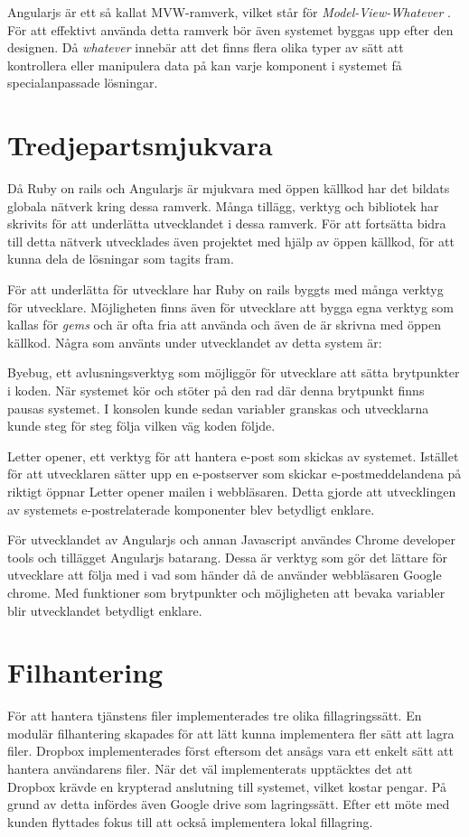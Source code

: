 Angularjs är ett så kallat MVW-ramverk, vilket står för \textit{Model-View-Whatever} \cite{angularjs}. För att effektivt använda detta ramverk bör även systemet byggas upp efter den designen. Då \textit{whatever} innebär att det finns flera olika typer av sätt att kontrollera eller manipulera data på kan varje komponent i systemet få specialanpassade lösningar.

\section{Tredjepartsmjukvara}
Då Ruby on rails och Angularjs är mjukvara med öppen källkod har det bildats globala nätverk kring dessa ramverk. Många tillägg, verktyg och bibliotek har skrivits för att underlätta utvecklandet i dessa ramverk. För att fortsätta bidra till detta nätverk utvecklades även projektet med hjälp av öppen källkod, för att kunna dela de lösningar som tagits fram.

För att underlätta för utvecklare har Ruby on rails byggts med många verktyg för utvecklare. Möjligheten finns även för utvecklare att bygga egna verktyg som kallas för \textit{gems} och är ofta fria att använda och även de är skrivna med öppen källkod. Några som använts under utvecklandet av detta system är:

Byebug, ett avlusningsverktyg som möjliggör för utvecklare att sätta brytpunkter i koden. När systemet kör och stöter på den rad där denna brytpunkt finns pausas systemet. I konsolen kunde sedan variabler granskas och utvecklarna kunde steg för steg följa vilken väg koden följde.

Letter opener, ett verktyg för att hantera e-post som skickas av systemet. Istället för att utvecklaren sätter upp en e-postserver som skickar e-postmeddelandena på riktigt öppnar Letter opener mailen i webbläsaren. Detta gjorde att utvecklingen av systemets e-postrelaterade komponenter blev betydligt enklare.

För utvecklandet av Angularjs och annan Javascript användes Chrome developer tools och tillägget Angularjs batarang. Dessa är verktyg som gör det lättare för utvecklare att följa med i vad som händer då de använder webbläsaren Google chrome. Med funktioner som brytpunkter och möjligheten att bevaka variabler blir utvecklandet betydligt enklare.

\section{Filhantering}
För att hantera tjänstens filer implementerades tre olika fillagringssätt. En modulär filhantering skapades för att lätt kunna implementera fler sätt att lagra filer. Dropbox implementerades först eftersom det ansågs vara ett enkelt sätt att hantera användarens filer. När det väl implementerats upptäcktes det att Dropbox krävde en krypterad anslutning till systemet, vilket kostar pengar. På grund av detta infördes även Google drive som lagringssätt. Efter ett möte med kunden flyttades fokus till att också implementera lokal fillagring.

